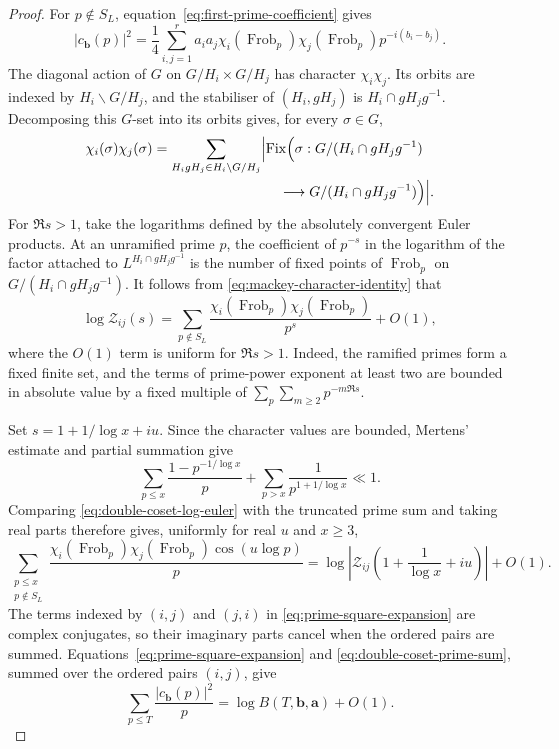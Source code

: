 \documentclass[11pt]{amsart}
\numberwithin{equation}{section}
\theoremstyle{plain}
\newcommand{\calZ}{\mathcal{Z}}
\renewcommand{\le}{\leqslant}
\renewcommand{\ge}{\geqslant}
\DeclareMathOperator{\Fix}{Fix}
\DeclareMathOperator{\Frob}{Frob}
\begin{document}
\begin{proof}
For $p\notin S_L$, equation~\eqref{eq:first-prime-coefficient} gives
\begin{equation}\label{eq:prime-square-expansion}
|c_{\mathbf b}(p)|^2
=\frac14\sum_{i,j=1}^r
a_i a_j\chi_i(\Frob_p)\chi_j(\Frob_p)
p^{-i(b_i-b_j)}.
\end{equation}
The diagonal action of $G$ on $G/H_i\times G/H_j$ has character
$\chi_i\chi_j$.  Its orbits are indexed by $H_i\backslash G/H_j$, and
the stabiliser of $(H_i,gH_j)$ is $H_i\cap gH_jg^{-1}$.  Decomposing this
$G$-set into its orbits gives, for every $\sigma\in G$,
\begin{equation}\label{eq:mackey-character-identity}
\begin{split}
\chi_i(\sigma)\chi_j(\sigma)
&=\sum_{H_i gH_j\in H_i\backslash G/H_j}
\Bigl|\Fix\Bigl(\sigma:G/(H_i\cap gH_jg^{-1})\\
&\hspace{9em}\longrightarrow
G/(H_i\cap gH_jg^{-1})\Bigr)\Bigr|.
\end{split}
\end{equation}
For $\Re s>1$, take the logarithms defined by the absolutely convergent
Euler products.  At an unramified prime $p$, the coefficient of $p^{-s}$
in the logarithm of the factor attached to
$L^{H_i\cap gH_jg^{-1}}$ is the number of fixed points of $\Frob_p$ on
$G/(H_i\cap gH_jg^{-1})$.  It follows from
\eqref{eq:mackey-character-identity} that
\begin{equation}\label{eq:double-coset-log-euler}
\log\calZ_{ij}(s)
=\sum_{p\notin S_L}
\frac{\chi_i(\Frob_p)\chi_j(\Frob_p)}{p^s}+O(1),
\end{equation}
where the $O(1)$ term is uniform for $\Re s>1$.  Indeed, the ramified
primes form a fixed
finite set, and the terms of prime-power exponent at least two are bounded
in absolute value by a fixed multiple of
$\sum_p\sum_{m\ge2}p^{-m\Re s}$.

Set $s=1+1/\log x+iu$.  Since the character values are bounded, Mertens'
estimate and partial summation give
\begin{equation*}
\sum_{p\le x}\frac{1-p^{-1/\log x}}p
+\sum_{p>x}\frac1{p^{1+1/\log x}}\ll1.
\end{equation*}
Comparing \eqref{eq:double-coset-log-euler} with the truncated prime sum
and taking real parts therefore gives, uniformly for real $u$ and $x\ge3$,
\begin{equation}\label{eq:double-coset-prime-sum}
\sum_{\substack{p\le x\\p\notin S_L}}
\frac{\chi_i(\Frob_p)\chi_j(\Frob_p)
\cos(u\log p)}{p}
=\log\left|\calZ_{ij}
\left(1+\frac{1}{\log x}+iu\right)\right|+O(1).
\end{equation}
The terms indexed by $(i,j)$ and $(j,i)$ in
\eqref{eq:prime-square-expansion} are complex conjugates, so their
imaginary parts cancel when the ordered pairs are summed.
Equations~\eqref{eq:prime-square-expansion} and
\eqref{eq:double-coset-prime-sum}, summed over the ordered pairs $(i,j)$,
give
\begin{equation}\label{eq:prime-sum-B}
\sum_{p\le T}\frac{|c_{\mathbf b}(p)|^2}{p}
=\log B(T,\mathbf b,\mathbf a)+O(1).
\end{equation}


\end{proof}
\end{document}
